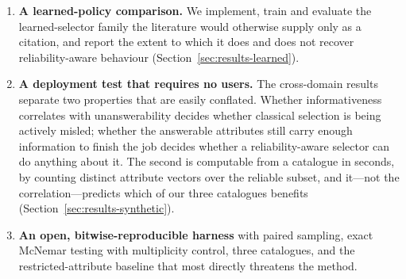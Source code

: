 \begin{enumerate}
\item \textbf{A learned-policy comparison.} We implement, train and evaluate
the learned-selector family the literature would otherwise supply only as a
citation, and report the extent to which it does and does not recover
reliability-aware behaviour (Section~\ref{sec:results-learned}).

\item \textbf{A deployment test that requires no users.} The cross-domain
results separate two properties that are easily conflated. Whether
informativeness correlates with unanswerability decides whether classical
selection is being actively misled; whether the answerable attributes still
carry enough information to finish the job decides whether a reliability-aware
selector can do anything about it. The second is computable from a catalogue in
seconds, by counting distinct attribute vectors over the reliable subset, and
it---not the correlation---predicts which of our three catalogues benefits
(Section~\ref{sec:results-synthetic}).

\item \textbf{An open, bitwise-reproducible harness} with paired sampling,
exact McNemar testing with multiplicity control, three catalogues, and the
restricted-attribute baseline that most directly threatens the method.
\end{enumerate}
